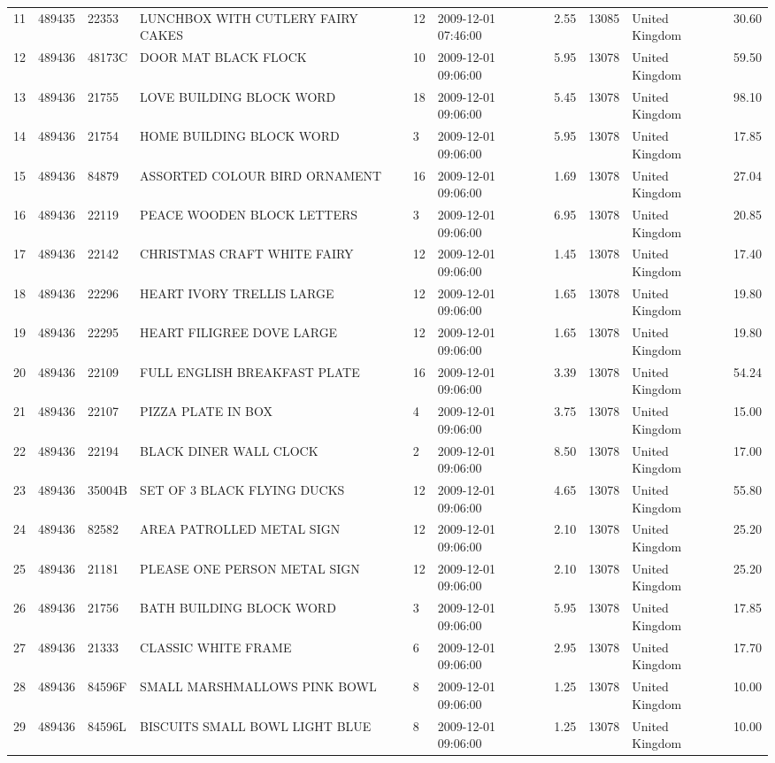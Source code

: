 \documentclass[
]{ctexart}
\begin{document}
{\begin{longtable}[]{@{}llllllllll@{}}
11 & 489435 & 22353 & LUNCHBOX WITH CUTLERY FAIRY CAKES & 12 &
2009-12-01 07:46:00 & 2.55 & 13085 & United Kingdom & 30.60 \\
12 & 489436 & 48173C & DOOR MAT BLACK FLOCK & 10 & 2009-12-01 09:06:00 &
5.95 & 13078 & United Kingdom & 59.50 \\
13 & 489436 & 21755 & LOVE BUILDING BLOCK WORD & 18 & 2009-12-01
09:06:00 & 5.45 & 13078 & United Kingdom & 98.10 \\
14 & 489436 & 21754 & HOME BUILDING BLOCK WORD & 3 & 2009-12-01 09:06:00
& 5.95 & 13078 & United Kingdom & 17.85 \\
15 & 489436 & 84879 & ASSORTED COLOUR BIRD ORNAMENT & 16 & 2009-12-01
09:06:00 & 1.69 & 13078 & United Kingdom & 27.04 \\
16 & 489436 & 22119 & PEACE WOODEN BLOCK LETTERS & 3 & 2009-12-01
09:06:00 & 6.95 & 13078 & United Kingdom & 20.85 \\
17 & 489436 & 22142 & CHRISTMAS CRAFT WHITE FAIRY & 12 & 2009-12-01
09:06:00 & 1.45 & 13078 & United Kingdom & 17.40 \\
18 & 489436 & 22296 & HEART IVORY TRELLIS LARGE & 12 & 2009-12-01
09:06:00 & 1.65 & 13078 & United Kingdom & 19.80 \\
19 & 489436 & 22295 & HEART FILIGREE DOVE LARGE & 12 & 2009-12-01
09:06:00 & 1.65 & 13078 & United Kingdom & 19.80 \\
20 & 489436 & 22109 & FULL ENGLISH BREAKFAST PLATE & 16 & 2009-12-01
09:06:00 & 3.39 & 13078 & United Kingdom & 54.24 \\
21 & 489436 & 22107 & PIZZA PLATE IN BOX & 4 & 2009-12-01 09:06:00 &
3.75 & 13078 & United Kingdom & 15.00 \\
22 & 489436 & 22194 & BLACK DINER WALL CLOCK & 2 & 2009-12-01 09:06:00 &
8.50 & 13078 & United Kingdom & 17.00 \\
23 & 489436 & 35004B & SET OF 3 BLACK FLYING DUCKS & 12 & 2009-12-01
09:06:00 & 4.65 & 13078 & United Kingdom & 55.80 \\
24 & 489436 & 82582 & AREA PATROLLED METAL SIGN & 12 & 2009-12-01
09:06:00 & 2.10 & 13078 & United Kingdom & 25.20 \\
25 & 489436 & 21181 & PLEASE ONE PERSON METAL SIGN & 12 & 2009-12-01
09:06:00 & 2.10 & 13078 & United Kingdom & 25.20 \\
26 & 489436 & 21756 & BATH BUILDING BLOCK WORD & 3 & 2009-12-01 09:06:00
& 5.95 & 13078 & United Kingdom & 17.85 \\
27 & 489436 & 21333 & CLASSIC WHITE FRAME & 6 & 2009-12-01 09:06:00 &
2.95 & 13078 & United Kingdom & 17.70 \\
28 & 489436 & 84596F & SMALL MARSHMALLOWS PINK BOWL & 8 & 2009-12-01
09:06:00 & 1.25 & 13078 & United Kingdom & 10.00 \\
29 & 489436 & 84596L & BISCUITS SMALL BOWL LIGHT BLUE & 8 & 2009-12-01
09:06:00 & 1.25 & 13078 & United Kingdom & 10.00 \\
\end{longtable}
}
\end{document}
